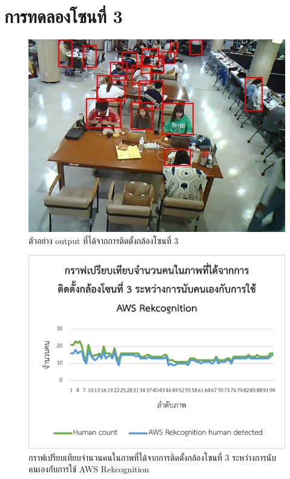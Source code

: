 \section{การทดลองโซนที่ 3}
\begin{figure}[ht]
    \centering
    \includegraphics[scale=0.5]{images/modified_ESP32-CAM(26).jpg}
    \caption[output3]{ตัวอย่าง output ที่ได้จากการติดตั้งกล้องโซนที่ 3}
    \label{fig:output3}
\end{figure}
\begin{figure}[ht]
    \centering
    \includegraphics[scale=1]{images/graph1_zone3.png}
    \caption[graph1-3]{กราฟเปรียบเทียบจำนวนคนในภาพที่ได้จากการติดตั้งกล้องโซนที่ 3 ระหว่างการนับคนเองกับการใช้ AWS Rekcognition}
    \label{fig:graph1-3}
\end{figure}
